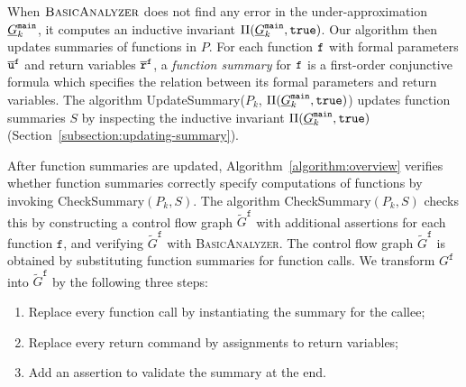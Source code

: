 When $\textsc{BasicAnalyzer}$ does not find any error in the
under-approximation $\underline{G}^{\mathtt{{main}}}_k$, it computes an inductive
invariant $\Pi (\underline{G}^{\mathtt{{main}}}_k, \mathtt{true})$. Our algorithm then updates
summaries of functions in $P$. For each function $\mathtt{{f}}$ with
formal parameters $\overline{\mathtt{u}}^{\mathtt{{f}}}$ and return
variables $\overline{\mathtt{r}}^{\mathtt{{f}}}$, a \emph{function summary} for
$\mathtt{{f}}$ is a 
first-order conjunctive formula which specifies the relation between
its formal parameters and return variables. The algorithm
UpdateSummary($P_k$, $\Pi (\underline{G}^{\mathtt{{main}}}_k, \mathtt{true})$) updates function summaries $S$ by inspecting
the inductive invariant $\Pi (\underline{G}^{\mathtt{{main}}}_k, \mathtt{true})$
(Section~\ref{subsection:updating-summary}). 

After function summaries are updated, Algorithm~\ref{algorithm:overview} 
verifies whether function summaries correctly specify computations of
functions by invoking CheckSummary$(P_k, S)$. The algorithm CheckSummary$(P_k, S)$ checks this by constructing a control flow 
graph $\tilde{G}^{\mathtt{f}}$ with additional assertions for each
function $\mathtt{f}$, and verifying $\tilde{G}^{\mathtt{f}}$ with
\textsc{BasicAnalyzer}. The control flow graph
$\tilde{G}^{\mathtt{f}}$ is obtained by substituting function
summaries for function calls.
We transform $G^{\mathtt{f}}$ into $\tilde{G}^{\mathtt{f}}$ by the
following three steps:
\begin{enumerate}
\item Replace every function call by instantiating the summary for the
  callee;
\item Replace every return command by assignments to return variables;
\item Add an assertion to validate the summary at the end.
\end{enumerate}
